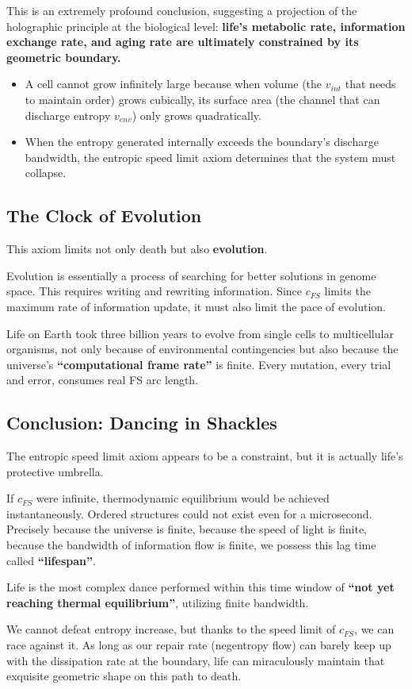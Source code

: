 This is an extremely profound conclusion, suggesting a projection of the holographic principle at the biological level: \textbf{life's metabolic rate, information exchange rate, and aging rate are ultimately constrained by its geometric boundary.}

\begin{itemize}
\item A cell cannot grow infinitely large because when volume (the $v_{int}$ that needs to maintain order) grows cubically, its surface area (the channel that can discharge entropy $v_{env}$) only grows quadratically.

\item When the entropy generated internally exceeds the boundary's discharge bandwidth, the entropic speed limit axiom determines that the system must collapse.
\end{itemize}

\subsection{The Clock of Evolution}

This axiom limits not only death but also \textbf{evolution}.

Evolution is essentially a process of searching for better solutions in genome space. This requires writing and rewriting information. Since $c_{FS}$ limits the maximum rate of information update, it must also limit the pace of evolution.

Life on Earth took three billion years to evolve from single cells to multicellular organisms, not only because of environmental contingencies but also because the universe's \textbf{``computational frame rate''} is finite. Every mutation, every trial and error, consumes real FS arc length.

\subsection{Conclusion: Dancing in Shackles}

The entropic speed limit axiom appears to be a constraint, but it is actually life's protective umbrella.

If $c_{FS}$ were infinite, thermodynamic equilibrium would be achieved instantaneously. Ordered structures could not exist even for a microsecond. Precisely because the universe is finite, because the speed of light is finite, because the bandwidth of information flow is finite, we possess this lag time called \textbf{``lifespan''}.

Life is the most complex dance performed within this time window of \textbf{``not yet reaching thermal equilibrium''}, utilizing finite bandwidth.

We cannot defeat entropy increase, but thanks to the speed limit of $c_{FS}$, we can race against it. As long as our repair rate (negentropy flow) can barely keep up with the dissipation rate at the boundary, life can miraculously maintain that exquisite geometric shape on this path to death.

